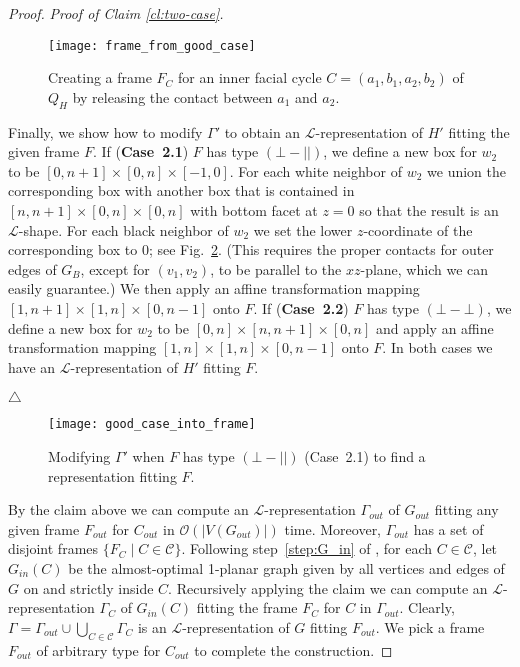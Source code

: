 \documentclass{article}
\newenvironment{claimproof}[1]{\noindent \textit{Proof of Claim #1.}}
{
\hfill $\triangle$\medskip
}
\newcommand{\LL}{$\mathcal{L}$\xspace}
\newcommand{\pperp}{\ensuremath{(\bot{-}\bot)}}
\newcommand{\ppar}{\ensuremath{(\bot{-}||)}}
\newcommand{\Oh}{{\ensuremath{\mathcal{O}}}}
\begin{document}
\begin{proof}
\begin{claimproof}{\ref{cl:two-case}}
\begin{description}
     \begin{figure}[htb]
\centering
      \texttt{[image: frame\_from\_good\_case]}
      \caption{Creating a frame $F_C$ for an inner facial cycle $C = (a_1,b_1,a_2,b_2)$ of $Q_H$ by releasing the contact between $a_1$ and $a_2$.}
      \label{fig:frame_from_good_case}
     \end{figure}

     Finally, we show how to modify $\Gamma'$ to obtain an \LL-representation of $H'$ fitting the given frame $F$.
     If (\textbf{Case~2.1}) $F$ has type $\ppar$, we define a new box for $w_2$ to be $[0,n+1]\times[0,n]\times[-1,0]$.
     For each white neighbor of $w_2$ we union the corresponding box with another box that is contained in $[n,n+1]\times[0,n]\times[0,n]$ with bottom facet at $z=0$ so that the result is an \LL-shape.
     For each black neighbor of $w_2$ we set the lower $z$-coordinate of the corresponding box to $0$; see Fig.~\ref{fig:good_case_into_frame}.
     (This requires the proper contacts for outer edges of $G_B$, except for $(v_1,v_2)$, to be parallel to the $xz$-plane, which we can easily guarantee.)
We then apply an affine transformation mapping $[1,n+1]\times[1,n]\times[0,n-1]$ onto $F$.
     If (\textbf{Case~2.2}) $F$ has type $\pperp$, we define a new box for $w_2$ to be $[0,n]\times[n,n+1]\times[0,n]$ and apply an affine transformation mapping $[1,n]\times[1,n]\times[0,n-1]$ onto $F$.
In both cases we have an \LL-representation of $H'$ fitting $F$.
\end{description}\vspace{-0.7cm}
 \end{claimproof}

     \begin{figure}[htb]
      \centering
      \texttt{[image: good\_case\_into\_frame]}
\caption{Modifying $\Gamma'$ when $F$ has type $\ppar$ (Case~2.1) to
find a representation fitting $F$.}
      \label{fig:good_case_into_frame}
     \end{figure}


By the claim above we can compute an \LL-representation $\Gamma_{out}$ of $G_{out}$ fitting any given
 frame $F_{out}$ for $C_{out}$ in $\Oh(|V(G_{out})|)$ time.
Moreover, $\Gamma_{out}$ has a set of disjoint frames $\{F_C \mid C \in \mathcal{C}\}$.
Following step~\ref{step:G_in} of {\drawOpt},
for each $C \in \mathcal{C}$, let $G_{in}(C)$ be the almost-optimal 1-planar graph given by all vertices
 and edges of $G$ on and strictly inside $C$.
Recursively applying the claim we can compute an \LL-representation $\Gamma_C$ of $G_{in}(C)$
 fitting the frame $F_C$ for $C$ in $\Gamma_{out}$.
Clearly, $\Gamma = \Gamma_{out} \cup \bigcup_{C \in \mathcal{C}} \Gamma_C$ is an \LL-representation
 of $G$ fitting $F_{out}$.
We pick a frame $F_{out}$ of arbitrary type for $C_{out}$ to complete the construction.
\end{proof}
\end{document}
